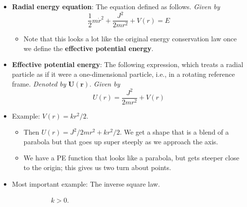 \documentclass[../notes.tex]{subfiles}
\begin{document}
\begin{itemize}
\begin{itemize}
    \end{itemize}
    \item \textbf{Radial energy equation}: The equation defined as follows. \emph{Given by}
    \begin{equation*}
        \frac{1}{2}m\dot{r}^2+\frac{J^2}{2mr^2}+V(r) = E
    \end{equation*}
    \begin{itemize}
        \item Note that this looks a lot like the original energy conservation law once we define the \textbf{effective potential energy}.
    \end{itemize}
    \item \textbf{Effective potential energy}: The following expression, which treats a radial particle as if it were a one-dimensional particle, i.e., in a rotating reference frame. \emph{Denoted by} $\bm{U(r)}$. \emph{Given by}
    \begin{equation*}
        U(r) = \frac{J^2}{2mr^2}+V(r)
    \end{equation*}
    \item Example: $V(r)=kr^2/2$.
    \begin{itemize}
        \item Then $U(r)=J^2/2mr^2+kr^2/2$. We get a shape that is a blend of a parabola but that goes up super steeply as we approach the axis.
        \item We have a PE function that looks like a parabola, but gets steeper close to the origin; this gives us two turn about points.
    \end{itemize}
    \item Most important example: The inverse square law.
    \begin{figure}[h!]
        \centering
        \begin{subfigure}[b]{0.3\linewidth}
            \centering
            \caption{$k>0$.}
            \label{fig:invSqPota}
        \end{subfigure}
        \begin{subfigure}[b]{0.3\linewidth}
            \centering
\end{subfigure}
\end{figure}
\end{itemize}
\end{document}
